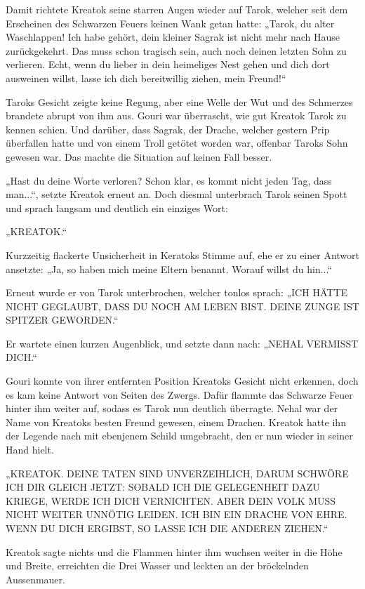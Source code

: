 \documentclass[10pt, a4paper, oneside]{book}
\begin{document}
Damit richtete Kreatok seine starren Augen wieder auf Tarok, welcher seit dem Erscheinen des Schwarzen Feuers keinen Wank getan hatte: „Tarok, du alter Waschlappen! Ich habe gehört, dein kleiner Sagrak ist nicht mehr nach Hause zurückgekehrt. Das muss schon tragisch sein, auch noch deinen letzten Sohn zu verlieren. Echt, wenn du lieber in dein heimeliges Nest gehen und dich dort ausweinen willst, lasse ich dich bereitwillig ziehen, mein Freund!“

Taroks Gesicht zeigte keine Regung, aber eine Welle der Wut und des Schmerzes brandete abrupt von ihm aus. Gouri war überrascht, wie gut Kreatok Tarok zu kennen schien. Und darüber, dass Sagrak, der Drache, welcher gestern Prip überfallen hatte und von einem Troll getötet worden war, offenbar Taroks Sohn gewesen war. Das machte die Situation auf keinen Fall besser.

„Hast du deine Worte verloren? Schon klar, es kommt nicht jeden Tag, dass man...“, setzte Kreatok erneut an. Doch diesmal unterbrach Tarok seinen Spott und sprach langsam und deutlich ein einziges Wort:

„KREATOK.“

Kurzzeitig flackerte Unsicherheit in Keratoks Stimme auf, ehe er zu einer Antwort ansetzte: „Ja, so haben mich meine Eltern benannt. Worauf willst du hin...“

Erneut wurde er von Tarok unterbrochen, welcher tonlos sprach: „ICH HÄTTE NICHT GEGLAUBT, DASS DU NOCH AM LEBEN BIST. DEINE ZUNGE IST SPITZER GEWORDEN.“

Er wartete einen kurzen Augenblick, und setzte dann nach: „NEHAL VERMISST DICH.“

Gouri konnte von ihrer entfernten Position Kreatoks Gesicht nicht erkennen, doch es kam keine Antwort von Seiten des Zwergs. Dafür flammte das Schwarze Feuer hinter ihm weiter auf, sodass es Tarok nun deutlich überragte. Nehal war der Name von Kreatoks besten Freund gewesen, einem Drachen. Kreatok hatte ihn der Legende nach mit ebenjenem Schild umgebracht, den er nun wieder in seiner Hand hielt.

„KREATOK. DEINE TATEN SIND UNVERZEIHLICH, DARUM SCHWÖRE ICH DIR GLEICH JETZT: SOBALD ICH DIE GELEGENHEIT DAZU KRIEGE, WERDE ICH DICH VERNICHTEN. ABER DEIN VOLK MUSS NICHT WEITER UNNÖTIG LEIDEN. ICH BIN EIN DRACHE VON EHRE. WENN DU DICH ERGIBST, SO LASSE ICH DIE ANDEREN ZIEHEN.“

Kreatok sagte nichts und die Flammen hinter ihm wuchsen weiter in die Höhe und Breite, erreichten die Drei Wasser und leckten an der bröckelnden Aussenmauer.
\end{document}
